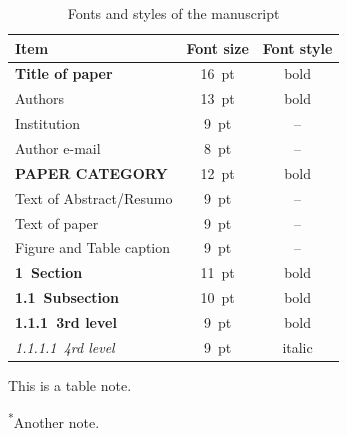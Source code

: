 \documentclass[alpha-refs,brazilian]{RBCA_v3.0}
\begin{document}
\begin{table}[ht]
	\centering
		\begin{threeparttable}
		\caption{Fonts and styles of the manuscript}
		\label{tab:example}
		\begin{tabular}{lcc}
			\toprule
			Item & Font size & Font style\\
			\toprule
			{\fontsize{16pt}{27pt}\bfseries Title of paper} & 16~pt & bold\\
			{\fontsize{13pt}{18pt}Authors} & 13~pt & bold\\
			{\fontsize{9pt}{13pt}Institution} & 9~pt & --\\
			{\fontsize{8pt}{9.5pt}Author e-mail} & 8~pt & --\\
			{\fontsize{10pt}{16pt}\bfseries\MakeUppercase{Paper category}} & 12~pt & bold\\
			{\fontsize{9pt}{11pt}Text of Abstract/Resumo} & 9~pt & --\\
			{\fontsize{9pt}{10.5pt}Text of paper} & 9~pt & --\\
			{\fontsize{9pt}{9pt}Figure and Table caption} & 9~pt & --\\
			{\fontsize{11pt}{12pt}\bfseries 1~Section} & 11~pt &	bold\\
			{\fontsize{10pt}{11pt}\bfseries 1.1~Subsection} & 10~pt &	bold\\
			{\fontsize{9pt}{11pt}\bfseries 1.1.1~3rd level} & 9~pt & bold\\
			{\fontsize{9pt}{11pt}\itshape 1.1.1.1~4rd level} & 9~pt & italic\\
			\bottomrule
		\end{tabular}

	\begin{tablenotes}
		\footnotesize
		\item This is a table note.
		\item \textsuperscript{*}Another note.
	\end{tablenotes}

\end{threeparttable}
\end{table}
\end{document}
